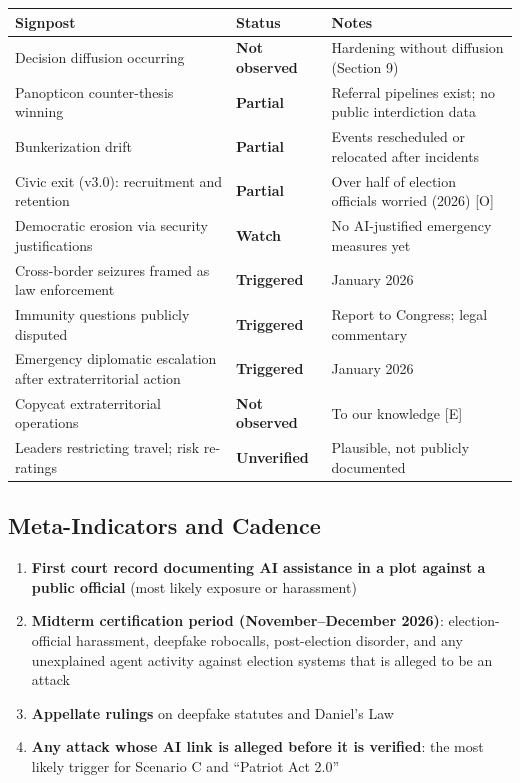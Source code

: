 \documentclass[11pt,letterpaper]{article}
\begin{document}
\begin{center}
\footnotesize
\begin{tabular}{L{6.2cm}L{2.2cm}L{5.7cm}}
\toprule
\textbf{Signpost} & \textbf{Status} & \textbf{Notes} \\
\midrule
Decision diffusion occurring & \textcolor{coolgray}{\textbf{Not observed}} & Hardening without diffusion (Section 9) \\
Panopticon counter-thesis winning & \textcolor{warningamber}{\textbf{Partial}} & Referral pipelines exist; no public interdiction data \\
Bunkerization drift & \textcolor{warningamber}{\textbf{Partial}} & Events rescheduled or relocated after incidents \\
Civic exit (v3.0): recruitment and retention & \textcolor{warningamber}{\textbf{Partial}} & Over half of election officials worried (2026) [O] \\
Democratic erosion via security justifications & \textbf{Watch} & No AI-justified emergency measures yet \\
\midrule
Cross-border seizures framed as law enforcement & \textcolor{alertcoral}{\textbf{Triggered}} & January 2026 \\
Immunity questions publicly disputed & \textcolor{alertcoral}{\textbf{Triggered}} & Report to Congress; legal commentary \\
Emergency diplomatic escalation after extraterritorial action & \textcolor{alertcoral}{\textbf{Triggered}} & January 2026 \\
Copycat extraterritorial operations & \textcolor{coolgray}{\textbf{Not observed}} & To our knowledge [E] \\
Leaders restricting travel; risk re-ratings & \textbf{Unverified} & Plausible, not publicly documented \\
\bottomrule
\end{tabular}
\end{center}

\subsection{Meta-Indicators and Cadence}

\begin{enumerate}
  \item \textbf{First court record documenting AI assistance in a plot against a public official} (most likely exposure or harassment)
  \item \textbf{Midterm certification period (November--December 2026)}: election-official harassment, deepfake robocalls, post-election disorder, and any unexplained agent activity against election systems that is alleged to be an attack
  \item \textbf{Appellate rulings} on deepfake statutes and Daniel's Law
  \item \textbf{Any attack whose AI link is alleged before it is verified}: the most likely trigger for Scenario C and ``Patriot Act 2.0''
\end{enumerate}
\end{document}
